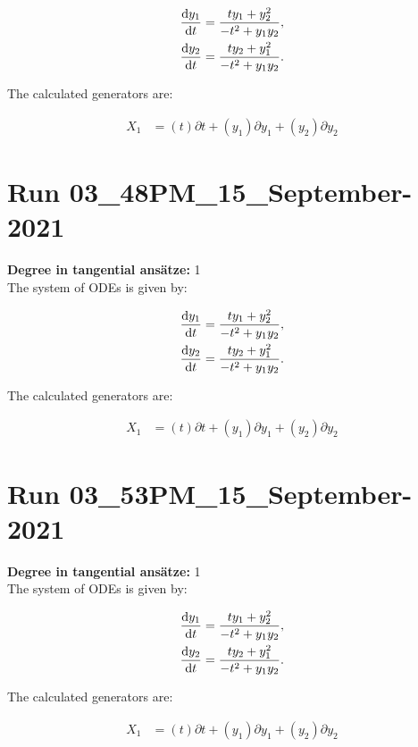 \begin{align*}
\dv{y_{1}}{t}&=\frac{t y_{1} + y_{2}^{2}}{- t^{2} + y_{1} y_{2}},\\
\dv{y_{2}}{t}&=\frac{t y_{2} + y_{1}^{2}}{- t^{2} + y_{1} y_{2}}.\\
\end{align*}

\noindent The calculated generators are:

\begin{align*}
X_{1}&=\left( t \right)\partial t+\left( y_{1} \right)\partial y_{1}+\left( y_{2} \right)\partial y_{2}\end{align*}
\section*{Run 03\_48PM\_15\_September-2021}
\textbf{Degree in tangential ansätze:}	1\\
The system of ODEs is given by:

\begin{align*}
\dv{y_{1}}{t}&=\frac{t y_{1} + y_{2}^{2}}{- t^{2} + y_{1} y_{2}},\\
\dv{y_{2}}{t}&=\frac{t y_{2} + y_{1}^{2}}{- t^{2} + y_{1} y_{2}}.\\
\end{align*}

\noindent The calculated generators are:

\begin{align*}
X_{1}&=\left( t \right)\partial t+\left( y_{1} \right)\partial y_{1}+\left( y_{2} \right)\partial y_{2}\end{align*}
\section*{Run 03\_53PM\_15\_September-2021}
\textbf{Degree in tangential ansätze:}	1\\
The system of ODEs is given by:

\begin{align*}
\dv{y_{1}}{t}&=\frac{t y_{1} + y_{2}^{2}}{- t^{2} + y_{1} y_{2}},\\
\dv{y_{2}}{t}&=\frac{t y_{2} + y_{1}^{2}}{- t^{2} + y_{1} y_{2}}.\\
\end{align*}

\noindent The calculated generators are:

\begin{align*}
X_{1}&=\left( t \right)\partial t+\left( y_{1} \right)\partial y_{1}+\left( y_{2} \right)\partial y_{2}\end{align*}
